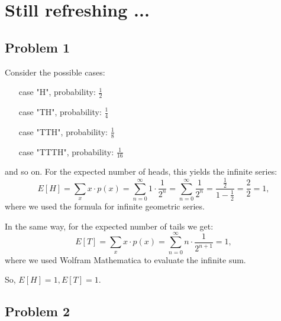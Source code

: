 
\section{Still refreshing ...}

\subsection*{Problem 1}

Consider the possible cases:
\begin{itemize}
  \item[case] "H", probability: $\frac{1}{2}$
  \item[case] "TH", probability: $\frac{1}{4}$
  \item[case] "TTH", probability: $\frac{1}{8}$
  \item[case] "TTTH", probability: $\frac{1}{16}$
\end{itemize}
and so on. For the expected number of heads, this yields the infinite series:
\begin{equation}
  E[H] = \sum_x x \cdot p(x) = \sum_{n=0}^\infty 1 \cdot \frac{1}{2^n} = 
         \sum_{n=0}^\infty \frac{1}{2^n} = \frac{\frac{1}{2}}{1 - \frac{1}{2}} = 
         \frac{2}{2} = 1,
\end{equation}
where we used the formula for infinite geometric series.

In the same way, for the expected number of tails we get:
\begin{equation}
  E[T] = \sum_x x \cdot p(x) = \sum_{n=0}^\infty n \cdot \frac{1}{2^{n+1}} = 1,
\end{equation}
where we used Wolfram Mathematica to evaluate the infinite sum.

So, $E[H] = 1, E[T] = 1$.





\subsection*{Problem 2}
